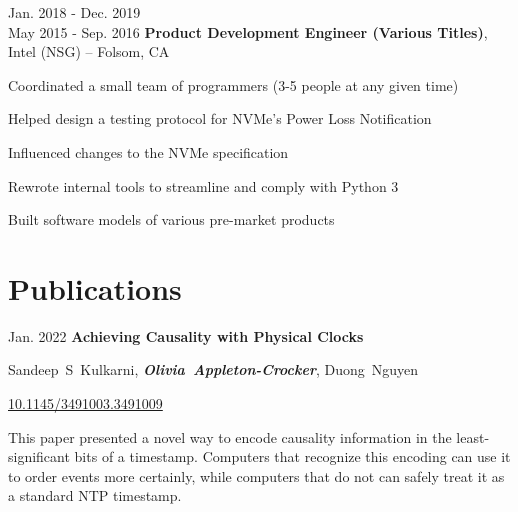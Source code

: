	\vspace{0.2 cm}

	\begin{twocolentry}
		{ Jan. 2018 - Dec. 2019 \\ May 2015 - Sep. 2016 } \textbf{Product
		Development Engineer (Various Titles)}, Intel (NSG) -- Folsom, CA
	\end{twocolentry}

	\vspace{-0.35 cm}
	\begin{onecolentry}
		\begin{highlights}
			\item Coordinated a small team of programmers (3-5 people at any given
			time) \item Helped design a testing protocol for NVMe's Power Loss Notification
			\item Influenced changes to the NVMe specification \item Rewrote internal tools
			to streamline and comply with Python 3
			\item Built software models of various pre-market products
		\end{highlights}
	\end{onecolentry}

	\vspace{0.6 cm}

	\section{Publications}

	\begin{samepage}
		\begin{twocolentry}
			{ Jan. 2022 } \textbf{Achieving Causality with Physical Clocks}
		\end{twocolentry}

		\vspace{0.10 cm}

		\begin{onecolentry}
			\mbox{Sandeep S Kulkarni},
			\mbox{\textbf{\textit{Olivia Appleton-Crocker}}}, \mbox{Duong Nguyen}

			\vspace{0.10 cm}

			\href{https://doi.org/10.1145/3491003.3491009}{10.1145/3491003.3491009} \vspace{0.1 cm}

			This paper presented a novel way to encode causality information in the least-significant bits of a timestamp. Computers that recognize this encoding can use it to order events more certainly, while computers that do not can safely treat it as a standard NTP timestamp.
		\end{onecolentry}
	\end{samepage}

